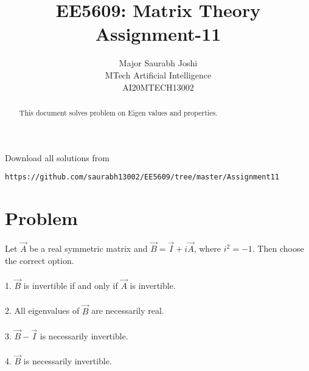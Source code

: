 \documentclass[journal,12pt,twocolumn]{IEEEtran}
\begin{document}
     \def\rightbox#1{\makebox[0in][r]{#1}}
     \def\centbox#1{\makebox[0in]{#1}}
     \def\topbox#1{\raisebox{-\baselineskip}[0in][0in]{#1}}
     \def\midbox#1{\raisebox{-0.5\baselineskip}[0in][0in]{#1}}
\vspace{3cm}
\onecolumn
\title{EE5609: Matrix Theory\\
          Assignment-11\\}
\author{Major Saurabh Joshi\\MTech Artificial Intelligence\\AI20MTECH13002 }
\maketitle
\bigskip
\renewcommand{\thefigure}{\theenumi}
\renewcommand{\thetable}{\theenumi}
\begin{abstract}
This document solves problem on Eigen values and properties.
\end{abstract}
Download all solutions from 
\begin{lstlisting}
https://github.com/saurabh13002/EE5609/tree/master/Assignment11
\end{lstlisting}
\section{\textbf{Problem}}
Let $\vec{A}$ be a real symmetric matrix and  $\vec{B}=\vec{I}+i\vec{A}$, where $i^2=-1$. Then choose the correct option.\\\\
1. $\vec{B}$ is invertible if and only if $\vec{A}$ is invertible.\\\\
2. All eigenvalues of $\vec{B}$ are necessarily real.\\\\
3. $\vec{B}-\vec{I}$ is necessarily invertible.\\\\
4. $\vec{B}$ is necessarily invertible.\\
\end{document}
